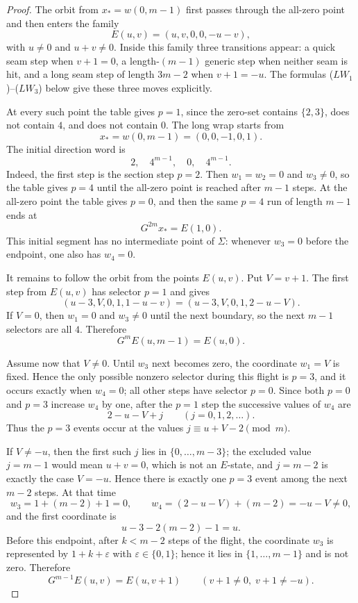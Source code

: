 \documentclass[11pt]{article}
\theoremstyle{definition}
\begin{document}
\begin{proof}
The orbit from \(x_*=w(0,m-1)\) first passes through the all-zero point and then enters the family
\[
E(u,v)=(u,v,0,0,-u-v),
\]
with \(u\ne0\) and \(u+v\ne0\).  Inside this family three transitions appear: a quick seam step when
\(v+1=0\), a length-\((m-1)\) generic step when neither seam is hit, and a long seam step of length
\(3m-2\) when \(v+1=-u\).  The formulas \textup{(\(LW_1\))}--\textup{(\(LW_3\))} below give these three moves
explicitly.

At every such point the table gives \(p=1\), since the zero-set
contains \(\{2,3\}\), does not contain \(4\), and does not contain \(0\).  The long wrap starts from
\[
x_*=w(0,m-1)=(0,0,-1,0,1).
\]
The initial direction word is
\[
2,\quad 4^{m-1},\quad 0,\quad 4^{m-1}.
\]
Indeed, the first step is the section step \(p=2\).  Then \(w_1=w_2=0\) and \(w_3\ne0\), so the table
gives \(p=4\) until the all-zero point is reached after \(m-1\) steps.  At the all-zero point the table
gives \(p=0\), and then the same \(p=4\) run of length \(m-1\) ends at
\[
G^{2m}x_*=E(1,0).
\]
This initial segment has no intermediate point of \(\Sigma\): whenever \(w_3=0\) before the endpoint,
one also has \(w_4=0\).

It remains to follow the orbit from the points \(E(u,v)\).  Put \(V=v+1\).  The first step from
\(E(u,v)\) has selector \(p=1\) and gives
\[
(u-3,V,0,1,1-u-v)=(u-3,V,0,1,2-u-V).
\]
If \(V=0\), then \(w_1=0\) and \(w_3\ne0\) until the next boundary, so the next \(m-1\) selectors are
all \(4\).  Therefore
\[
G^mE(u,m-1)=E(u,0). \tag{$LW_1$}
\]

Assume now that \(V\ne0\).  Until \(w_3\) next becomes zero, the coordinate \(w_1=V\) is fixed.  Hence
the only possible nonzero selector during this flight is \(p=3\), and it occurs exactly when
\(w_4=0\); all other steps have selector \(p=0\).  Since both \(p=0\) and \(p=3\) increase \(w_4\) by
one, after the \(p=1\) step the successive values of \(w_4\) are
\[
2-u-V+j\qquad (j=0,1,2,\ldots).
\]
Thus the \(p=3\) events occur at the values \(j\equiv u+V-2\pmod m\).

If \(V\ne -u\), then the first such \(j\) lies in \(\{0,
\ldots,m-3\}\); the excluded value \(j=m-1\) would mean \(u+v=0\), which is not an \(E\)-state, and
\(j=m-2\) is exactly the case \(V=-u\).  Hence there is exactly one \(p=3\) event among the next
\(m-2\) steps.  At that time
\[
w_3=1+(m-2)+1=0,
\qquad
w_4=(2-u-V)+(m-2)=-u-V\ne0,
\]
and the first coordinate is
\[
u-3-2(m-2)-1=u.
\]
Before this endpoint, after \(k<m-2\) steps of the flight, the coordinate \(w_3\) is represented by
\(1+k+\varepsilon\) with \(\varepsilon\in\{0,1\}\); hence it lies in \(\{1,\ldots,m-1\}\) and is not zero.
Therefore
\[
G^{m-1}E(u,v)=E(u,v+1)\qquad (v+1\ne0,\; v+1\ne -u). \tag{$LW_2$}
\]


\end{proof}
\end{document}
